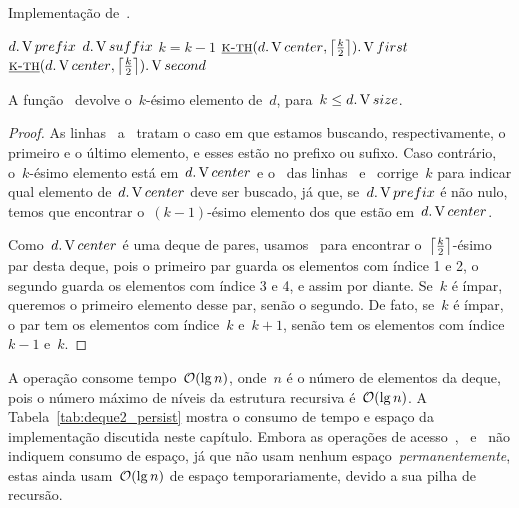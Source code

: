 \documentclass[main.tex]{subfiles}
\begin{document}
\begin{algorithm}
\caption{Implementação de~.} \label{lst:deque_kth}
\begin{algorithmic}[1]

	 \label{line:kth:if1}
		\State \Return $d.\V{prefix}$
	\EndIf
		\State \Return $d.\V{suffix}$ \label{line:kth:if2}
	\EndIf
	 \label{line:kth:if3}
		\State $k = k - 1$ \label{line:kth:if3e}
	\EndIf
		\State \Return $\funcAPI{k-th}{d.\V{center}, \ceil*{\frac{k}{2}}}.\V{first}$
	\Else
		\State \Return $\funcAPI{k-th}{d.\V{center}, \ceil*{\frac{k}{2}}}.\V{second}$
	\EndIf
\EndFunction

\end{algorithmic}
\end{algorithm}


\begin{proposition}
A função~ devolve o~$k$-ésimo elemento de~$d$, para~$k \leq d.\V{size}$.
\end{proposition}

\begin{proof}
As linhas~ a~ tratam o caso em que estamos buscando, respectivamente, o primeiro e o último elemento, e esses estão no prefixo ou sufixo. Caso contrário, o~$k$-ésimo elemento está em~$d.\V{center}$ e o~ das linhas~ e~ corrige~$k$ para indicar qual elemento de~$d.\V{center}$ deve ser buscado, já que, se~$d.\V{prefix}$ é não nulo, temos que encontrar o~$(k-1)$-ésimo elemento dos que estão em~$d.\V{center}$.

Como~$d.\V{center}$ é uma deque de pares, usamos~ para encontrar o~$\ceil*{\frac{k}{2}}$-ésimo par desta deque, pois o primeiro par guarda os elementos com índice 1 e 2, o segundo guarda os elementos com índice 3 e 4, e assim por diante. Se~$k$ é ímpar, queremos o primeiro elemento desse par, senão o segundo. De fato, se~$k$ é ímpar, o par tem os elementos com índice~$k$ e~$k+1$, senão tem os elementos com índice~$k-1$ e~$k$.
\end{proof}

A operação consome tempo~$\Oh(\lg n)$, onde~$n$ é o número de elementos da deque, pois o número máximo de níveis da estrutura recursiva é~$\Oh(\lg n)$. A Tabela~\ref{tab:deque2_persist} mostra o consumo de tempo e espaço da implementação discutida neste capítulo. Embora as operações de acesso~,~ e~ não indiquem consumo de espaço, já que não usam nenhum espaço~\emph{permanentemente}, estas ainda usam~$\Oh(\lg n)$ de espaço temporariamente, devido a sua pilha de recursão.
\end{document}
